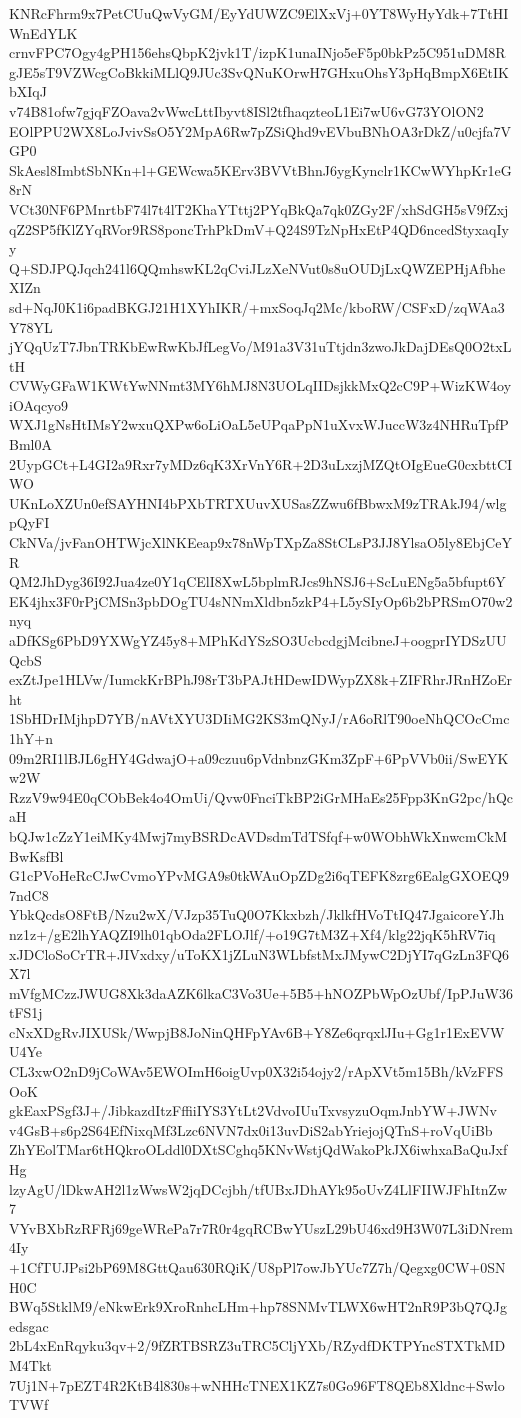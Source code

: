 KNRcFhrm9x7PetCUuQwVyGM/EyYdUWZC9ElXxVj+0YT8WyHyYdk+7TtHIWnEdYLK
crnvFPC7Ogy4gPH156ehsQbpK2jvk1T/izpK1unaINjo5eF5p0bkPz5C951uDM8R
gJE5sT9VZWcgCoBkkiMLlQ9JUc3SvQNuKOrwH7GHxuOhsY3pHqBmpX6EtIKbXIqJ
v74B81ofw7gjqFZOava2vWwcLttIbyvt8ISl2tfhaqzteoL1Ei7wU6vG73YOlON2
EOlPPU2WX8LoJvivSsO5Y2MpA6Rw7pZSiQhd9vEVbuBNhOA3rDkZ/u0cjfa7VGP0
SkAesl8ImbtSbNKn+l+GEWcwa5KErv3BVVtBhnJ6ygKynclr1KCwWYhpKr1eG8rN
VCt30NF6PMnrtbF74l7t4lT2KhaYTttj2PYqBkQa7qk0ZGy2F/xhSdGH5sV9fZxj
qZ2SP5fKlZYqRVor9RS8poncTrhPkDmV+Q24S9TzNpHxEtP4QD6ncedStyxaqIyy
Q+SDJPQJqch241l6QQmhswKL2qCviJLzXeNVut0s8uOUDjLxQWZEPHjAfbheXIZn
sd+NqJ0K1i6padBKGJ21H1XYhIKR/+mxSoqJq2Mc/kboRW/CSFxD/zqWAa3Y78YL
jYQqUzT7JbnTRKbEwRwKbJfLegVo/M91a3V31uTtjdn3zwoJkDajDEsQ0O2txLtH
CVWyGFaW1KWtYwNNmt3MY6hMJ8N3UOLqIIDsjkkMxQ2cC9P+WizKW4oyiOAqcyo9
WXJ1gNsHtIMsY2wxuQXPw6oLiOaL5eUPqaPpN1uXvxWJuccW3z4NHRuTpfPBml0A
2UypGCt+L4GI2a9Rxr7yMDz6qK3XrVnY6R+2D3uLxzjMZQtOIgEueG0cxbttCIWO
UKnLoXZUn0efSAYHNI4bPXbTRTXUuvXUSasZZwu6fBbwxM9zTRAkJ94/wlgpQyFI
CkNVa/jvFanOHTWjcXlNKEeap9x78nWpTXpZa8StCLsP3JJ8YlsaO5ly8EbjCeYR
QM2JhDyg36I92Jua4ze0Y1qCElI8XwL5bplmRJcs9hNSJ6+ScLuENg5a5bfupt6Y
EK4jhx3F0rPjCMSn3pbDOgTU4sNNmXldbn5zkP4+L5ySIyOp6b2bPRSmO70w2nyq
aDfKSg6PbD9YXWgYZ45y8+MPhKdYSzSO3UcbcdgjMcibneJ+oogprIYDSzUUQcbS
exZtJpe1HLVw/IumckKrBPhJ98rT3bPAJtHDewIDWypZX8k+ZIFRhrJRnHZoErht
1SbHDrIMjhpD7YB/nAVtXYU3DIiMG2KS3mQNyJ/rA6oRlT90oeNhQCOcCmc1hY+n
09m2RI1lBJL6gHY4GdwajO+a09czuu6pVdnbnzGKm3ZpF+6PpVVb0ii/SwEYKw2W
RzzV9w94E0qCObBek4o4OmUi/Qvw0FnciTkBP2iGrMHaEs25Fpp3KnG2pc/hQcaH
bQJw1cZzY1eiMKy4Mwj7myBSRDcAVDsdmTdTSfqf+w0WObhWkXnwcmCkMBwKsfBl
G1cPVoHeRcCJwCvmoYPvMGA9s0tkWAuOpZDg2i6qTEFK8zrg6EalgGXOEQ97ndC8
YbkQcdsO8FtB/Nzu2wX/VJzp35TuQ0O7Kkxbzh/JklkfHVoTtIQ47JgaicoreYJh
nz1z+/gE2lhYAQZI9lh01qbOda2FLOJlf/+o19G7tM3Z+Xf4/klg22jqK5hRV7iq
xJDCloSoCrTR+JIVxdxy/uToKX1jZLuN3WLbfstMxJMywC2DjYI7qGzLn3FQ6X7l
mVfgMCzzJWUG8Xk3daAZK6lkaC3Vo3Ue+5B5+hNOZPbWpOzUbf/IpPJuW36tFS1j
cNxXDgRvJIXUSk/WwpjB8JoNinQHFpYAv6B+Y8Ze6qrqxlJIu+Gg1r1ExEVWU4Ye
CL3xwO2nD9jCoWAv5EWOImH6oigUvp0X32i54ojy2/rApXVt5m15Bh/kVzFFSOoK
gkEaxPSgf3J+/JibkazdItzFffiiIYS3YtLt2VdvoIUuTxvsyzuOqmJnbYW+JWNv
v4GsB+s6p2S64EfNixqMf3Lzc6NVN7dx0i13uvDiS2abYriejojQTnS+roVqUiBb
ZhYEolTMar6tHQkroOLddl0DXtSCghq5KNvWstjQdWakoPkJX6iwhxaBaQuJxfHg
lzyAgU/lDkwAH2l1zWwsW2jqDCcjbh/tfUBxJDhAYk95oUvZ4LlFIIWJFhItnZw7
VYvBXbRzRFRj69geWRePa7r7R0r4gqRCBwYUszL29bU46xd9H3W07L3iDNrem4Iy
+1CfTUJPsi2bP69M8GttQau630RQiK/U8pPl7owJbYUc7Z7h/Qegxg0CW+0SNH0C
BWq5StklM9/eNkwErk9XroRnhcLHm+hp78SNMvTLWX6wHT2nR9P3bQ7QJgedsgac
2bL4xEnRqyku3qv+2/9fZRTBSRZ3uTRC5CljYXb/RZydfDKTPYncSTXTkMDM4Tkt
7Uj1N+7pEZT4R2KtB4l830s+wNHHcTNEX1KZ7s0Go96FT8QEb8Xldnc+SwloTVWf
